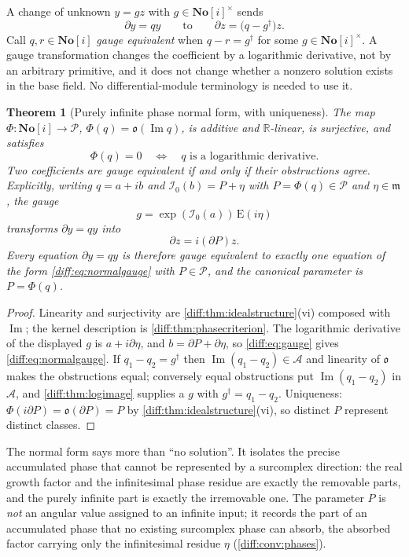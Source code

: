 \documentclass[11pt,letterpaper]{article}
\numberwithin{equation}{section}
\newtheorem{theorem}{Theorem}[section]
\theoremstyle{definition}
\theoremstyle{remark}
\newcommand{\SC}{\mathbf{No}[i]}
\newcommand{\R}{\mathbb R}
\newcommand{\der}{\partial}
\newcommand{\mm}{\mathfrak m}
\newcommand{\Pcl}{\mathcal P}
\newcommand{\Acl}{\mathcal A}
\newcommand{\Izero}{\mathcal I_{0}}
\newcommand{\Obs}{\mathfrak o}
\newcommand{\Imm}{\operatorname{Im}}
\newcommand{\Emm}{\mathrm{E}}
\begin{document}
A change of unknown $y=gz$ with $g\in\SC^{\times}$ sends
\begin{equation}\label{diff:eq:gauge}
 \der y=qy
 \qquad\text{to}\qquad
 \der z=\bigl(q-g^{\dagger}\bigr)z .
\end{equation}
Call $q,r\in\SC$ \emph{gauge equivalent} when $q-r=g^{\dagger}$ for some
$g\in\SC^{\times}$. A gauge transformation changes the coefficient by a
logarithmic derivative, not by an arbitrary primitive, and it does not change
whether a nonzero solution exists in the base field. No differential-module
terminology is needed to use it.

\begin{theorem}[Purely infinite phase normal form, with uniqueness]
\label{diff:thm:gauge}
The map $\Phi:\SC\to\Pcl$, $\Phi(q)=\Obs(\Imm q)$, is additive and
$\R$-linear, is surjective, and satisfies
\[
 \Phi(q)=0\quad\Longleftrightarrow\quad
 q\text{ is a logarithmic derivative} .
\]
Two coefficients are gauge equivalent if and only if their obstructions agree.
Explicitly, writing $q=a+ib$ and $\Izero(b)=P+\eta$ with $P=\Phi(q)\in\Pcl$
and $\eta\in\mm$, the gauge
\[
 g=\exp(\Izero(a))\,\Emm(i\eta)
\]
transforms $\der y=qy$ into
\begin{equation}\label{diff:eq:normalgauge}
 \der z=i(\der P)z .
\end{equation}
Every equation $\der y=qy$ is therefore gauge equivalent to \emph{exactly one}
equation of the form \cref{diff:eq:normalgauge} with $P\in\Pcl$, and the
canonical parameter is $P=\Phi(q)$.
\end{theorem}
\begin{proof}
Linearity and surjectivity are \cref{diff:thm:idealstructure}(vi) composed
with $\Imm$; the kernel description is \cref{diff:thm:phasecriterion}. The
logarithmic derivative of the displayed $g$ is $a+i\der\eta$, and
$b=\der P+\der\eta$, so \cref{diff:eq:gauge} gives
\cref{diff:eq:normalgauge}. If $q_{1}-q_{2}=g^{\dagger}$ then
$\Imm(q_{1}-q_{2})\in\Acl$ and linearity of $\Obs$ makes the obstructions
equal; conversely equal obstructions put $\Imm(q_{1}-q_{2})$ in $\Acl$, and
\cref{diff:thm:logimage} supplies a $g$ with $g^{\dagger}=q_{1}-q_{2}$.
Uniqueness: $\Phi(i\der P)=\Obs(\der P)=P$ by
\cref{diff:thm:idealstructure}(vi), so distinct $P$ represent distinct classes.
\end{proof}

The normal form says more than ``no solution''. It isolates the precise
accumulated phase that cannot be represented by a surcomplex direction: the
real growth factor and the infinitesimal phase residue are exactly the
removable parts, and the purely infinite part is exactly the irremovable one.
The parameter $P$ is \emph{not} an angular value assigned to an infinite
input; it records the part of an accumulated phase that no existing surcomplex
phase can absorb, the absorbed factor carrying only the infinitesimal residue
$\eta$ (\cref{diff:conv:phases}).
\end{document}
